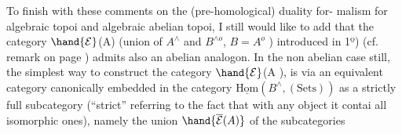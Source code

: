  To finish with these comments on the (pre-homological) duality for-%
malism for algebraic topoi and algebraic abelian topoi, I still would
like to add that the category $\hand{\mathcal{E}}$(A) (union of $A^{\wedge}$ and $B^{\wedge o}$,   $B=A^{o}$ )
introduced in 1º) (cf. remark on page ) admits also an abelian
analogon. In the non abelian case still, the simplest way to construct
the category $\hand{\mathcal{E}}$(A ), is via an equivalent category canonically embedded
in the category $\underline{\text{Hom}}(B^{\wedge}, (\text{Sets}))$ as a strictly full subcategory
(``strict'' referring to the fact that  with any object it contai
all isomorphic ones), namely the union $\hand{\overline{\mathcal{E}}(A)}$ of the  subcategories

